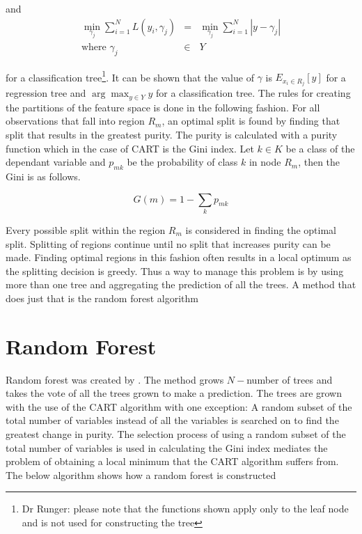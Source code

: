 and 
\begin{equation}
	\begin{array}{rcl}
		 \min_{\gamma_j} \sum_{i=1}^N L(y_i,\gamma_j) & = &  \min_{\gamma_j} \sum_{i=1}^N |y-\gamma_j| \\
	\mbox{where }	\gamma_j &\in & Y
	\end{array}
\end{equation}

 
for a classification tree\footnote{Dr Runger: please note that the functions shown apply only to the leaf node and is not used for constructing the tree}. It can be shown that the value of $\gamma$ is $E_{x_i \in R_j}[y]$ for a regression tree and $\arg\max_{y\in Y} y$ for a classification tree. The rules for creating the partitions of the feature space is done in the following fashion. For all observations that fall into region $R_m$, an optimal split is found by finding that split that results in the greatest purity. The purity is calculated with a purity function which in the case of CART is the Gini index. Let $k \in K$ be a class of the dependant variable and $p_{mk}$ be the probability of class $k$ in node $R_m$, then the Gini is as follows.

\begin{equation}
	G(m)= 1-\displaystyle\sum_k p_{mk}
\end{equation}

Every possible split within the region $R_m$ is considered in finding the optimal split. Splitting of regions continue until no split that increases purity can be made. Finding optimal regions in this fashion often results in a local optimum as the splitting decision is greedy. Thus a way to manage this problem is by using more than one tree and aggregating the prediction of all the trees. A method that does just that is the random forest algorithm

\section{Random Forest}
Random forest was created by \citet{Breiman01}. The method grows $N-$number of trees and takes the vote of all the trees grown to make a prediction. The trees are grown with the use of the CART algorithm with one exception: A random subset of the total number of variables instead of all the variables is searched on to find the greatest change in purity. The selection process of using a random subset of the total number of variables is used in calculating the Gini index mediates the problem of obtaining a local minimum that the CART algorithm suffers from. The below algorithm shows how a random forest is constructed

